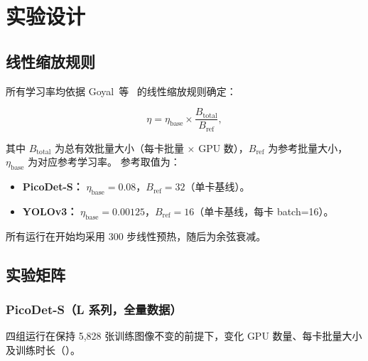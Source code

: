 \section{实验设计}
\label{sec:experiments}

\subsection{线性缩放规则}

所有学习率均依据 Goyal~等~\citep{goyal2017accurate} 的线性缩放规则确定：

\begin{equation}
  \eta = \eta_\text{base} \times \frac{B_\text{total}}{B_\text{ref}},
  \label{eq:lsr}
\end{equation}

\noindent 其中 $B_\text{total}$ 为总有效批量大小（每卡批量 $\times$ GPU 数），$B_\text{ref}$ 为参考批量大小，$\eta_\text{base}$ 为对应参考学习率。
参考取值为：

\begin{itemize}[leftmargin=1.5em]
  \item \textbf{PicoDet-S：} $\eta_\text{base}=0.08$，$B_\text{ref}=32$（单卡基线）。
  \item \textbf{YOLOv3：} $\eta_\text{base}=0.00125$，$B_\text{ref}=16$（单卡基线，每卡 batch=16）。
\end{itemize}

所有运行在开始均采用 300 步线性预热，随后为余弦衰减。

\subsection{实验矩阵}

\subsubsection{PicoDet-S（L 系列，全量数据）}

四组运行在保持 5,828 张训练图像不变的前提下，变化 GPU 数量、每卡批量大小及训练时长（）。

\begin{table}[H]
\centering
\caption{PicoDet-S 实验配置（L 系列）。}
\label{tab:picodet_config}
\end{table}

